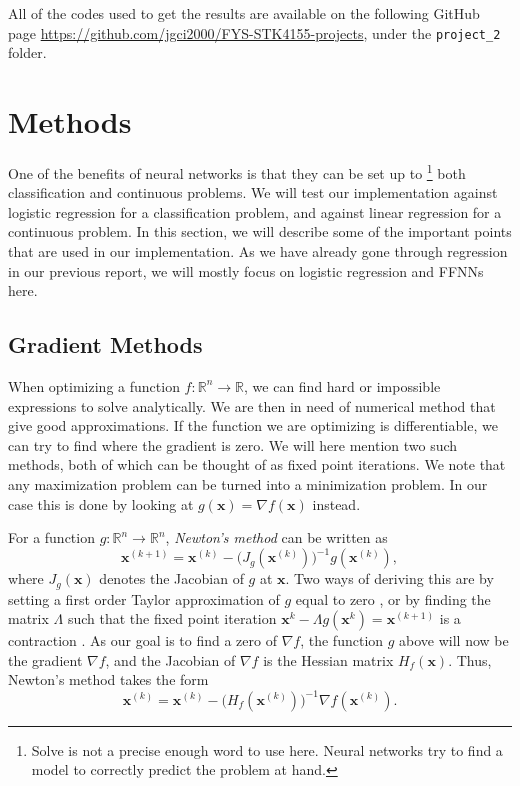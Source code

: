 \documentclass[aps,reprint,superscriptaddress,nofootinbib]{revtex4-2}
\begin{document}
    All of the codes used to get the results are available on the following GitHub page \url{https://github.com/jgci2000/FYS-STK4155-projects}, under the \texttt{project\_2} folder.

\section*{Methods}
    One of the benefits of neural networks is that they can be set up to \footnote{Solve is not a precise enough word to use here. Neural networks try to find a model to correctly predict the problem at hand.} both classification and continuous problems. We will test our implementation against logistic regression for a classification problem, and against linear regression for a continuous problem. In this section, we will describe some of the important points that are used in our implementation. As we have already gone through regression in our previous report, we will mostly focus on logistic regression and FFNNs here.

\subsection*{Gradient Methods}
    When optimizing a function \(f:\mathbb{R}^n\to\mathbb{R}\), we can find hard or impossible expressions to solve analytically. We are then in need of numerical method that give good approximations. If the function we are optimizing is differentiable, we can try to find where the gradient is zero. We will here mention two such methods, both of which can be thought of as fixed point iterations. We note that any maximization problem can be turned into a minimization problem. In our case this is done by looking at \(g(\bm{x})=\nabla f(\bm{x})\) instead.
    
    For a function \(g:\mathbb{R}^n\to\mathbb{R}^n\), \textit{Newton's method} can be written as
    \begin{equation*}
        \bm{x}^{(k+1)}=\bm{x}^{(k)}-\big(J_g(\bm{x}^{(k)})\big)^{-1}g(\bm{x}^{(k)}),
    \end{equation*}
    where \(J_g(\bm{x})\) denotes the Jacobian of \(g\) at \(\bm{x}\). Two ways of deriving this are by setting a first order Taylor approximation of \(g\) equal to zero \cite{bonnans2013numerical}, or by finding the matrix \(\Lambda\) such that the fixed point iteration \(\bm{x}^{k}-\Lambda g(\bm{x}^{k})=\bm{x}^{(k+1)}\) is a contraction \cite{num_anal_mayers}. As our goal is to find a zero of \(\nabla f\), the function \(g\) above will now be the gradient \(\nabla f\), and the Jacobian of \(\nabla f\) is the Hessian matrix \(H_f(\bm{x})\). Thus, Newton's method takes the form
    \begin{equation*}
        \bm{x}^{(k)}=\bm{x}^{(k)}-\big(H_f(\bm{x}^{(k)})\big)^{-1}\nabla f(\bm{x}^{(k)}).
    \end{equation*}
    
\end{document}

